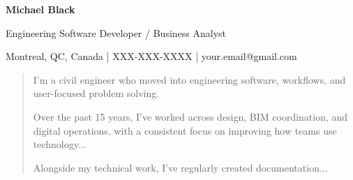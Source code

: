 \documentclass[11pt,a4paper]{article}
\newcommand{\name}[1]{\begin{center}\LARGE \textbf{#1}\end{center}}
\newcommand{\position}[1]{\begin{center}#1\end{center}}
\newcommand{\contact}[3]{\begin{center}#1 \quad | \quad #2 \quad | \quad #3\end{center}}
\begin{document}
\name{Michael Black}
\position{Engineering Software Developer / Business Analyst}
\contact{Montreal, QC, Canada}{XXX-XXX-XXXX}{your.email@gmail.com}
\begin{quote}
I’m a civil engineer who moved into engineering software, workflows, and user-focused problem solving.

Over the past 15 years, I’ve worked across design, BIM coordination, and digital operations, with a consistent focus on improving how teams use technology...

Alongside my technical work, I’ve regularly created documentation...
\end{quote}






\end{document}

